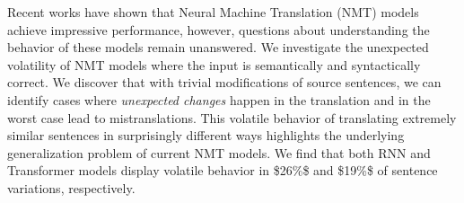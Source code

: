 Recent works have shown that Neural Machine Translation (NMT) models achieve impressive performance, however, questions about understanding the behavior of these models remain unanswered. We investigate the unexpected volatility of NMT models where the input is semantically and syntactically correct. We discover that with trivial modifications of source sentences, we can identify cases where \textit{unexpected changes} happen in the translation and in the worst case lead to mistranslations. This volatile behavior of translating extremely similar sentences in surprisingly different ways highlights the underlying generalization problem of current NMT models. We find that both RNN and Transformer models display volatile behavior in \$26\%\$ and \$19\%\$ of sentence variations, respectively.

